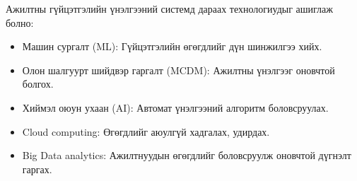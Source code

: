 
Ажилтны гүйцэтгэлийн үнэлгээний системд дараах технологиудыг ашиглаж болно:
\begin{itemize}
    \item Машин сургалт (ML): Гүйцэтгэлийн өгөгдлийг дүн шинжилгээ хийх.
    \item Олон шалгуурт шийдвэр гаргалт (MCDM): Ажилтны үнэлгээг оновчтой болгох.
    \item Хиймэл оюун ухаан (AI): Автомат үнэлгээний алгоритм боловсруулах.
    \item Cloud computing: Өгөгдлийг аюулгүй хадгалах, удирдах.
    \item Big Data analytics: Ажилтнуудын өгөгдлийг боловсруулж оновчтой дүгнэлт гаргах.
\end{itemize}
